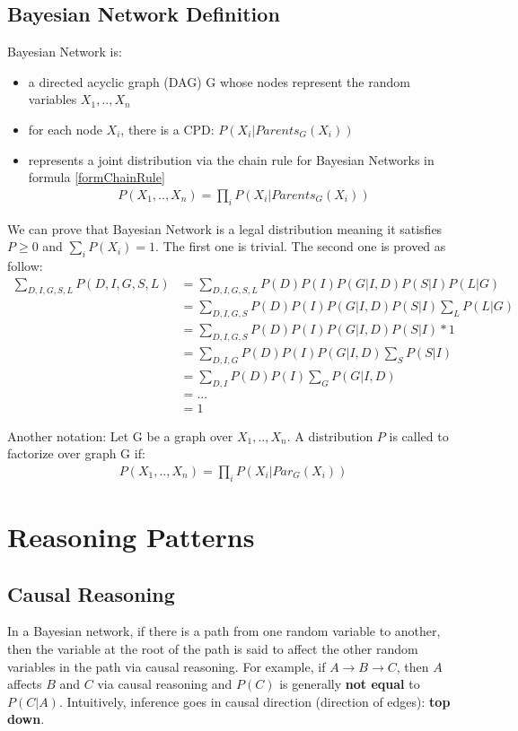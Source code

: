 \subsection{Bayesian Network Definition}
Bayesian Network is:
\begin{itemize}
	\item a directed acyclic graph (DAG) G whose nodes represent the random variables $X_1,..,X_n$
	\item for each node $X_i$, there is a CPD: $P(X_i | Parents_G(X_i))$
	\item represents a joint distribution via the chain rule for Bayesian Networks in formula \ref{formChainRule} 
	\begin{align}\label{formChainRule}
	P(X_1,..,X_n) = \prod_i P(X_i|Parents_G(X_i))
	\end{align}
\end{itemize}
We can prove that Bayesian Network is a legal distribution meaning it satisfies $P \geq 0$ and $\sum_i P(X_i) = 1$. The first one is trivial. The second one is proved as follow:
\begin{align*}
\sum_{D,I,G,S,L} P(D,I,G,S,L) 	&= \sum_{D,I,G,S,L} P(D)P(I)P(G|I,D)P(S|I)P(L|G) \\
								&= \sum_{D,I,G,S} P(D)P(I)P(G|I,D)P(S|I) \sum_L P(L|G) \\
								&= \sum_{D,I,G,S} P(D)P(I)P(G|I,D)P(S|I) * 1\\
								&= \sum_{D,I,G} P(D)P(I)P(G|I,D) \sum_S P(S|I)\\
								&= \sum_{D,I} P(D)P(I) \sum_G P(G|I,D)\\
								&= ...\\
								&= 1
\end{align*}

Another notation: Let G be a graph over $X_1, .., X_n$. A distribution $P$ is called to factorize over graph G if:
\begin{align*}
P(X_1, .., X_n) = \prod_i P(X_i | Par_G(X_i))
\end{align*}

\section{Reasoning Patterns}

\subsection{Causal Reasoning}
In a Bayesian network, if there is a path from one random variable to another, then the variable at the root of the path is said to affect the other random variables in the path via causal reasoning. For example, if $A \rightarrow B \rightarrow C$, then $A$ affects $B$ and $C$ via causal reasoning and $P(C)$ is generally \textbf{not equal} to $P(C|A)$.
Intuitively, inference goes in causal direction (direction of edges): \textbf{top down}.


